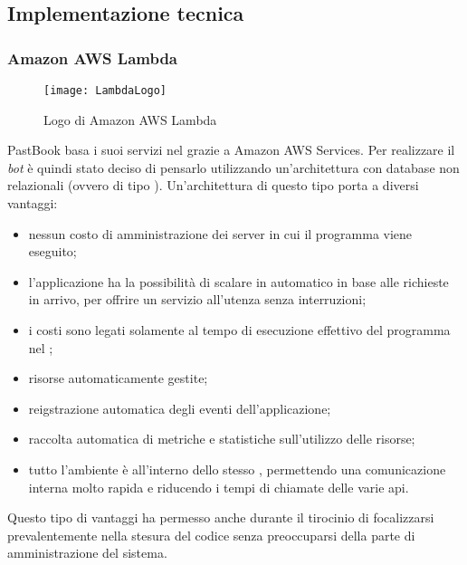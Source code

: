 \subsection{Implementazione tecnica}

\subsubsection{Amazon AWS Lambda}
\begin{figure}[H]
  \centering
  \texttt{[image: LambdaLogo]}
  \caption{Logo di Amazon AWS Lambda}
\end{figure}
PastBook basa i suoi servizi nel  grazie a Amazon AWS
Services. Per realizzare il \textit{bot} è quindi stato deciso di pensarlo
utilizzando un'architettura  con database non
relazionali (ovvero di tipo ). Un'architettura di questo
tipo porta a diversi vantaggi:

\begin{itemize}

  \item nessun costo di amministrazione dei server in cui il programma viene
eseguito;
  \item l'applicazione ha la possibilità di scalare in automatico in base alle
richieste in arrivo, per offrire un servizio all'utenza senza interruzioni;
  \item i costi sono legati solamente al tempo di esecuzione effettivo del
programma nel ;
  \item risorse automaticamente gestite;
  \item reigstrazione automatica degli eventi dell'applicazione;
  \item raccolta automatica di metriche e statistiche sull'utilizzo delle
risorse;
  \item tutto l'ambiente è all'interno dello stesso ,
permettendo una comunicazione interna molto rapida e riducendo i tempi di
chiamate delle varie \gls{api}.
\end{itemize}

Questo tipo di vantaggi ha permesso anche durante il tirocinio di focalizzarsi
prevalentemente nella stesura del codice senza preoccuparsi della parte di
amministrazione del sistema.

